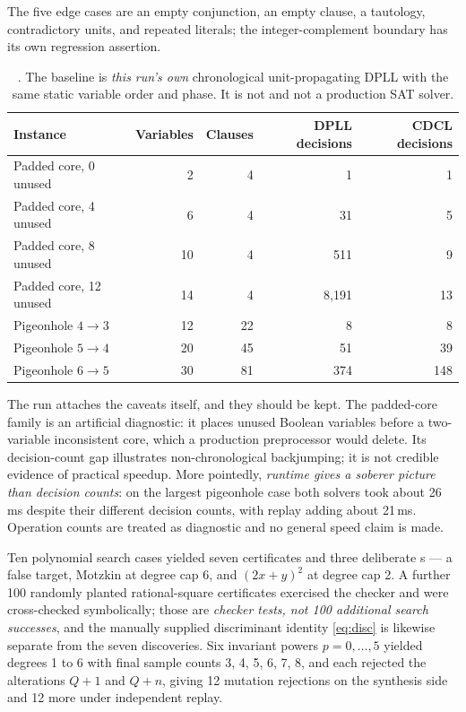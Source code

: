The five edge cases are an empty conjunction, an empty clause, a tautology,
contradictory units, and repeated literals; the integer-complement boundary has
its own regression assertion.

\begin{table}[htbp]
\centering\small
\begin{tabular}{@{}lrrrr@{}}
\toprule
Instance & Variables & Clauses & DPLL decisions & CDCL decisions \\
\midrule
Padded core, 0 unused  &  2 &  4 &     1 &   1 \\
Padded core, 4 unused  &  6 &  4 &    31 &   5 \\
Padded core, 8 unused  & 10 &  4 &   511 &   9 \\
Padded core, 12 unused & 14 &  4 & 8{,}191 &  13 \\
Pigeonhole $4\to3$     & 12 & 22 &     8 &   8 \\
Pigeonhole $5\to4$     & 20 & 45 &    51 &  39 \\
Pigeonhole $6\to5$     & 30 & 81 &   374 & 148 \\
\bottomrule
\end{tabular}
\caption{. The baseline is \emph{this run's own} chronological
unit-propagating DPLL with the same static variable order and phase. It is not
\grind{} and not a production SAT solver.}
\label{tab:p6-dpll}
\end{table}

The run attaches the caveats itself, and they should be kept. The padded-core
family is an artificial diagnostic: it places unused Boolean variables before a
two-variable inconsistent core, which a production preprocessor would delete.
Its decision-count gap illustrates non-chronological backjumping; it is not
credible evidence of practical speedup. More pointedly, \emph{runtime gives a
soberer picture than decision counts}: on the largest pigeonhole case both
solvers took about 26\,ms despite their different decision counts, with replay
adding about 21\,ms. Operation counts are treated as diagnostic and no general
speed claim is made.

Ten polynomial search cases yielded seven certificates and three deliberate
\unknown{}s --- a false target, Motzkin at degree cap 6, and $(2x+y)^2$ at degree
cap 2. A further 100 randomly planted rational-square certificates exercised the
checker and were cross-checked symbolically; those are \emph{checker tests, not
100 additional search successes}, and the manually supplied discriminant
identity \eqref{eq:disc} is likewise separate from the seven discoveries. Six
invariant powers $p=0,\ldots,5$ yielded degrees 1 to 6 with final sample counts
3, 4, 5, 6, 7, 8, and each rejected the alterations $Q+1$ and $Q+n$, giving 12
mutation rejections on the synthesis side and 12 more under independent replay.

